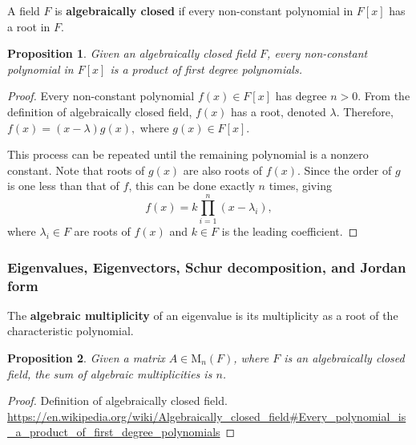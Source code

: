 \documentclass[12pt, letterpaper]{article}
\newcommand{\MM}{\mathrm{M}}
\newtheorem{prop}{Proposition}[section]
\theoremstyle{definition}
\theoremstyle{remark}
\theoremstyle{definition}
\theoremstyle{plain}
\begin{document}
	\begin{def*}
		A field $F$ is \textbf{algebraically closed} if every non-constant polynomial in $F[x]$ has a root in $F$.
	\end{def*}
	\begin{prop}
		Given an algebraically closed field $F$, every non-constant polynomial in $F[x]$ is a product of first degree polynomials.
	\end{prop}
	\begin{proof}
		Every non-constant polynomial $f(x)\in F[x]$ has degree $n>0$. From the definition of algebraically closed field,
		$f(x)$ has a root, denoted $\lambda$.
		Therefore,
		$f(x)=(x-\lambda)g(x),$
		where $g(x)\in F[x]$.
		
		This process can be repeated until the remaining polynomial is a nonzero constant.
		Note that roots of $g(x)$ are also roots of $f(x)$.
		Since the order of $g$ is one less than that of $f$, this can be done exactly $n$ times,
		giving
		\[f(x)=k\prod_{i=1}^{n}(x-\lambda_i),\]
		where $\lambda_i\in F$ are roots of $f(x)$ and $k\in F$ is the leading coefficient.
	\end{proof}

	\subsubsection*{Eigenvalues, Eigenvectors, Schur decomposition, and Jordan form}
	
	\begin{def*}
		The \textbf{algebraic multiplicity} of an eigenvalue is its multiplicity as a root of the characteristic polynomial.
	\end{def*}
	\begin{prop}
		Given a matrix $A\in\MM_n(F)$, where $F$ is an algebraically closed field,
		the sum of algebraic multiplicities is $n$.
	\end{prop}
	\begin{proof}
		Definition of algebraically closed field.
		\url{https://en.wikipedia.org/wiki/Algebraically_closed_field#Every_polynomial_is_a_product_of_first_degree_polynomials}
	\end{proof}
	
\end{document}
